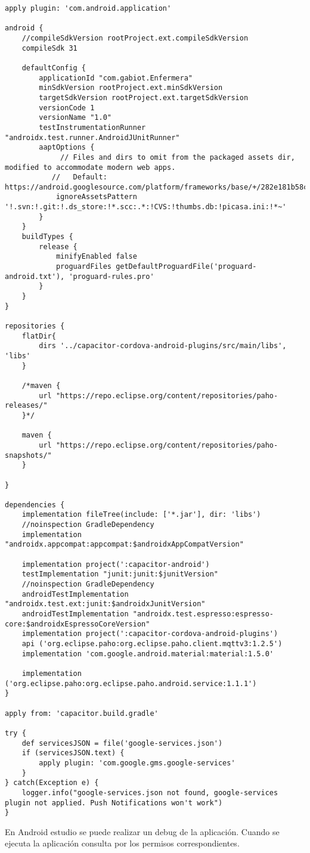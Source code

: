 \begin{lstlisting}[label=cod:buildGradle,caption= Archivo build.gradle(Module:android.app).]  
apply plugin: 'com.android.application'

android {
    //compileSdkVersion rootProject.ext.compileSdkVersion
    compileSdk 31

    defaultConfig {
        applicationId "com.gabiot.Enfermera"
        minSdkVersion rootProject.ext.minSdkVersion
        targetSdkVersion rootProject.ext.targetSdkVersion
        versionCode 1
        versionName "1.0"
        testInstrumentationRunner "androidx.test.runner.AndroidJUnitRunner"
        aaptOptions {
             // Files and dirs to omit from the packaged assets dir, modified to accommodate modern web apps.
           //   Default: https://android.googlesource.com/platform/frameworks/base/+/282e181b58cf72b6ca770dc7ca5f91f135444502/tools/aapt/AaptAssets.cpp#61
            ignoreAssetsPattern '!.svn:!.git:!.ds_store:!*.scc:.*:!CVS:!thumbs.db:!picasa.ini:!*~'
        }
    }
    buildTypes {
        release {
            minifyEnabled false
            proguardFiles getDefaultProguardFile('proguard-android.txt'), 'proguard-rules.pro'
        }
    }
}

repositories {
    flatDir{
        dirs '../capacitor-cordova-android-plugins/src/main/libs', 'libs'
    }

    /*maven {
        url "https://repo.eclipse.org/content/repositories/paho-releases/"
    }*/

    maven {
        url "https://repo.eclipse.org/content/repositories/paho-snapshots/"
    }

}

dependencies {
    implementation fileTree(include: ['*.jar'], dir: 'libs')
    //noinspection GradleDependency
    implementation "androidx.appcompat:appcompat:$androidxAppCompatVersion"

    implementation project(':capacitor-android')
    testImplementation "junit:junit:$junitVersion"
    //noinspection GradleDependency
    androidTestImplementation "androidx.test.ext:junit:$androidxJunitVersion"
    androidTestImplementation "androidx.test.espresso:espresso-core:$androidxEspressoCoreVersion"
    implementation project(':capacitor-cordova-android-plugins')
    api ('org.eclipse.paho:org.eclipse.paho.client.mqttv3:1.2.5')
    implementation 'com.google.android.material:material:1.5.0'

    implementation ('org.eclipse.paho:org.eclipse.paho.android.service:1.1.1')
}

apply from: 'capacitor.build.gradle'

try {
    def servicesJSON = file('google-services.json')
    if (servicesJSON.text) {
        apply plugin: 'com.google.gms.google-services'
    }
} catch(Exception e) {
    logger.info("google-services.json not found, google-services plugin not applied. Push Notifications won't work")
}
\end{lstlisting}


En Android estudio se puede realizar un debug de la aplicación.
Cuando se ejecuta la aplicación consulta por los permisos correspondientes.
